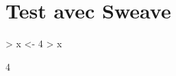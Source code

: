 \chapter{Test avec Sweave}
\begin{Schunk}
\begin{Sinput}
> x <- 4
> x
\end{Sinput}
\begin{Soutput}
[1] 4
\end{Soutput}
\end{Schunk}

